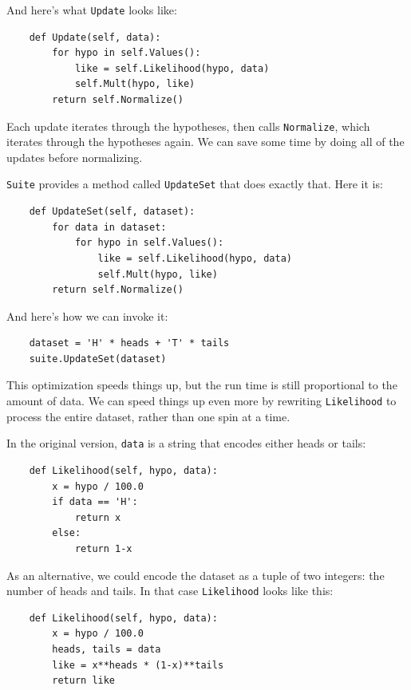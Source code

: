 \documentclass[12pt]{book}
\begin{document}
And here's what \verb"Update" looks like:

\begin{verbatim}
    def Update(self, data):
        for hypo in self.Values():
            like = self.Likelihood(hypo, data)
            self.Mult(hypo, like)
        return self.Normalize()
\end{verbatim}

Each update iterates through the hypotheses, then calls \verb"Normalize",
which iterates through the hypotheses again.  We can save some
time by doing all of the updates before normalizing.

\verb"Suite" provides a method called \verb"UpdateSet" that does
exactly that.  Here it is:

\begin{verbatim}
    def UpdateSet(self, dataset):
        for data in dataset:
            for hypo in self.Values():
                like = self.Likelihood(hypo, data)
                self.Mult(hypo, like)
        return self.Normalize()
\end{verbatim}

And here's how we can invoke it:

\begin{verbatim}
    dataset = 'H' * heads + 'T' * tails
    suite.UpdateSet(dataset)
\end{verbatim}

This optimization speeds things up, but the run time is still
proportional to the amount of data.  We can speed things up
even more by rewriting \verb"Likelihood" to process the entire
dataset, rather than one spin at a time.

In the original version,
\verb"data" is a string that encodes either heads or tails:

\begin{verbatim}
    def Likelihood(self, hypo, data):
        x = hypo / 100.0
        if data == 'H':
            return x
        else:
            return 1-x
\end{verbatim}

As an alternative, we could encode the dataset as a tuple of 
two integers: the number of heads and tails.
In that case \verb"Likelihood" looks like this:

\begin{verbatim}
    def Likelihood(self, hypo, data):
        x = hypo / 100.0
        heads, tails = data
        like = x**heads * (1-x)**tails
        return like
\end{verbatim}
\end{document}
